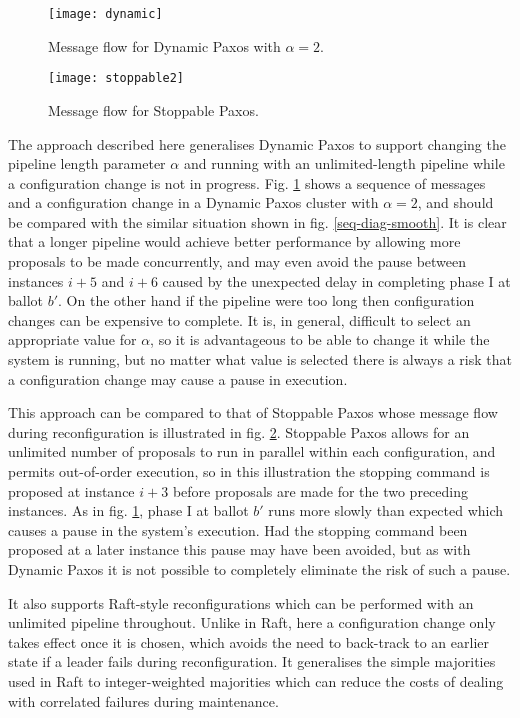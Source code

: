 \documentclass[journal]{IEEEtran}
\begin{document}
\begin{figure}[!t]
\centering
\texttt{[image: dynamic]}
\caption{Message flow for Dynamic Paxos with $\alpha = 2$. \label{seq-diag-dynamic}}
\end{figure}

\begin{figure}[!t]
\centering
\texttt{[image: stoppable2]}
\caption{Message flow for Stoppable Paxos. \label{seq-diag-stoppable-ooo}}
\end{figure}

The approach described here generalises Dynamic Paxos\cite{cheap-paxos} to
support changing the pipeline length parameter $\alpha$ and running with an
unlimited-length pipeline while a configuration change is not in progress. Fig.
\ref{seq-diag-dynamic} shows a sequence of messages and a configuration change
in a Dynamic Paxos cluster with $\alpha = 2$, and should be compared with the
similar situation shown in fig.  \ref{seq-diag-smooth}. It is clear that a
longer pipeline would achieve better performance by allowing more proposals to
be made concurrently, and may even avoid the pause between instances $i+5$ and
$i+6$ caused by the unexpected delay in completing phase I at ballot $b'$. On
the other hand if the pipeline were too long then configuration changes can be
expensive to complete. It is, in general, difficult to select an appropriate
value for $\alpha$, so it is advantageous to be able to change it while the
system is running, but no matter what value is selected there is always a risk
that a configuration change may cause a pause in execution.

This approach can be compared to that of Stoppable Paxos\cite{stoppable-paxos}
whose message flow during reconfiguration is illustrated in fig.
\ref{seq-diag-stoppable-ooo}.  Stoppable Paxos allows for an unlimited number
of proposals to run in parallel within each configuration, and permits
out-of-order execution, so in this illustration the stopping command is
proposed at instance $i+3$ before proposals are made for the two preceding
instances. As in fig. \ref{seq-diag-dynamic}, phase I at ballot $b'$ runs more
slowly than expected which causes a pause in the system's execution. Had the
stopping command been proposed at a later instance this pause may have been
avoided, but as with Dynamic Paxos it is not possible to completely eliminate
the risk of such a pause.

It also supports Raft-style reconfigurations\cite{raft} which can be performed
with an unlimited pipeline throughout. Unlike in Raft, here a configuration
change only takes effect once it is chosen, which avoids the need to back-track
to an earlier state if a leader fails during reconfiguration.  It generalises
the simple majorities used in Raft to integer-weighted majorities which can
reduce the costs of dealing with correlated failures during maintenance.
\end{document}
